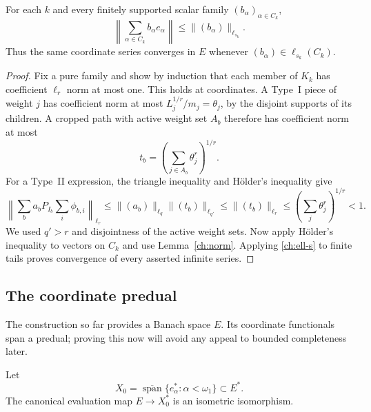 \begin{lemma}
\label{ch:color-bound}\label{ch:coordinates}
For each $k$ and every finitely supported scalar family
$(b_\alpha)_{\alpha\in C_k}$,
\begin{equation}
 \left\|\sum_{\alpha\in C_k}b_\alpha e_\alpha\right\|
 \le \|(b_\alpha)\|_{\ell_{s_k}}.
 \label{ch:ell-s}
\end{equation}
Thus the same coordinate series converges in $E$ whenever
$(b_\alpha)\in\ell_{s_k}(C_k)$.
\end{lemma}

\begin{proof}
Fix a pure family and show by induction that each member of $K_k$ has
coefficient $\ell_r$ norm at most one.  This holds at coordinates.  A
Type~I piece of weight $j$ has coefficient norm at most
$L_j^{1/r}/m_j=\theta_j$, by the disjoint supports of its children.
A cropped path with active weight set $A_b$ therefore has coefficient
norm at most
\[
 t_b=\left(\sum_{j\in A_b}\theta_j^r\right)^{1/r}.
\]
For a Type~II expression, the triangle inequality and H\"older's
inequality give
\[
 \left\|\sum_b a_b P_{I_b}\sum_i\phi_{b,i}\right\|_{\ell_r}
 \le \|(a_b)\|_{\ell_q}\|(t_b)\|_{\ell_{q'}}
 \le\|(t_b)\|_{\ell_r}
 \le\left(\sum_j\theta_j^r\right)^{1/r}<1.
\]
We used $q'>r$ and disjointness of the active weight sets.
Now apply H\"older's inequality to vectors on $C_k$ and use
Lemma~\ref{ch:norm}.  Applying \eqref{ch:ell-s} to finite tails proves
convergence of every asserted infinite series.
\end{proof}

\subsection{The coordinate predual}

The construction so far provides a Banach space $E$.  Its coordinate
functionals span a predual; proving this now will avoid any appeal to
bounded completeness later.

\begin{proposition}\label{ch:predual}
Let
\[
 X_0=\overline{\operatorname{span}}\{e_\alpha^*:\alpha<\omega_1\}
 \subset E^*.
\]
The canonical evaluation map $E\longrightarrow X_0^*$ is an isometric
isomorphism.
\end{proposition}

